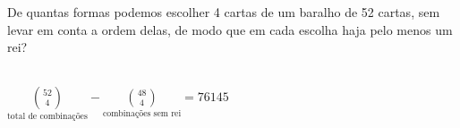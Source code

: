 \begin{ex}
 De quantas formas podemos escolher 4 cartas de um baralho de 52 cartas, sem levar em conta a ordem delas, de modo que em cada escolha haja pelo menos um rei?
 
 \begin{sol}
     \phantom{A} \\
$\underset{\text{total de combinações}}{\binom{52}{4}} - \underset{\text{combinações sem rei}}{\binom{48}{4}} = 76145$
 \end{sol}
\end{ex}